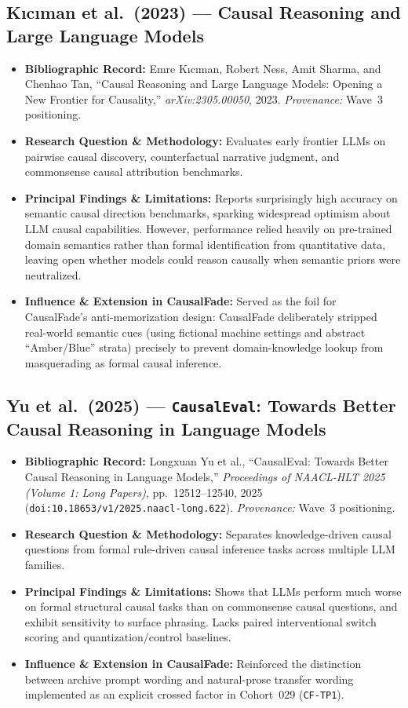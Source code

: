 \subsection{K\i c\i man et al.\ (2023) --- Causal Reasoning and Large Language Models \citep{kiciman2023causal}}
\begin{itemize}
  \item \textbf{Bibliographic Record:} Emre K\i c\i man, Robert Ness, Amit Sharma, and Chenhao Tan, ``Causal Reasoning and Large Language Models: Opening a New Frontier for Causality,'' \emph{arXiv:2305.00050}, 2023. \emph{Provenance:} Wave~3 positioning.
  \item \textbf{Research Question \& Methodology:} Evaluates early frontier LLMs on pairwise causal discovery, counterfactual narrative judgment, and commonsense causal attribution benchmarks.
  \item \textbf{Principal Findings \& Limitations:} Reports surprisingly high accuracy on semantic causal direction benchmarks, sparking widespread optimism about LLM causal capabilities. However, performance relied heavily on pre-trained domain semantics rather than formal identification from quantitative data, leaving open whether models could reason causally when semantic priors were neutralized.
  \item \textbf{Influence \& Extension in CausalFade:} Served as the foil for CausalFade's anti-memorization design: CausalFade deliberately stripped real-world semantic cues (using fictional machine settings and abstract ``Amber/Blue'' strata) precisely to prevent domain-knowledge lookup from masquerading as formal causal inference.
\end{itemize}

\subsection{Yu et al.\ (2025) --- \texttt{CausalEval}: Towards Better Causal Reasoning in Language Models \citep{yu2025causaleval}}
\begin{itemize}
  \item \textbf{Bibliographic Record:} Longxuan Yu et al., ``CausalEval: Towards Better Causal Reasoning in Language Models,'' \emph{Proceedings of NAACL-HLT 2025 (Volume 1: Long Papers)}, pp.~12512--12540, 2025 (\texttt{doi:10.18653/v1/2025.naacl-long.622}). \emph{Provenance:} Wave~3 positioning.
  \item \textbf{Research Question \& Methodology:} Separates knowledge-driven causal questions from formal rule-driven causal inference tasks across multiple LLM families.
  \item \textbf{Principal Findings \& Limitations:} Shows that LLMs perform much worse on formal structural causal tasks than on commonsense causal questions, and exhibit sensitivity to surface phrasing. Lacks paired interventional switch scoring and quantization/control baselines.
  \item \textbf{Influence \& Extension in CausalFade:} Reinforced the distinction between archive prompt wording and natural-prose transfer wording implemented as an explicit crossed factor in Cohort~029 (\texttt{CF-TP1}).
\end{itemize}

